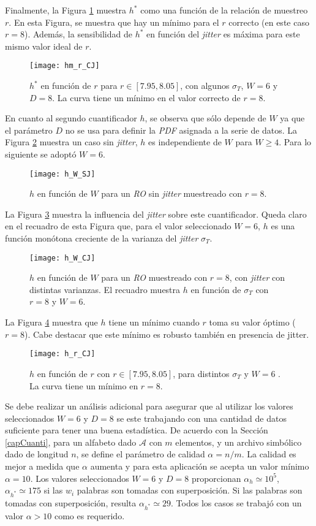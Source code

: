 Finalmente, la Figura \ref{fig:hm_r_CJ} muestra $h^*$ como una función de la relación de muestreo $r$.
En esta Figura, se muestra que hay un mínimo para el $r$ correcto (en este caso $r = 8$).
Además, la sensibilidad de $h^*$ en función del \textit{jitter} es máxima para este mismo valor ideal de $r$.
%
\begin{figure}
\centering
\texttt{[image: hm\_r\_CJ]}
\caption{$h^*$ en función de $r$ para $r\in[7.95,8.05]$, con algunos $\sigma_T$, $W=6$ y $D=8$. La curva tiene un mínimo en el valor correcto de $r=8$.}
\label{fig:hm_r_CJ}
\end{figure}

En cuanto al segundo cuantificador $h$, se observa que sólo depende de $W$ ya que el parámetro $ D $ no se usa para definir la \emph{PDF} asignada a la serie de datos.
La Figura \ref{fig:h_W_SJ} muestra un caso sin \textit{jitter}, $h$ es independiente de $W$ para $W \ge 4$.
Para lo siguiente se adoptó $W = 6$.
%
\begin{figure}
	\centering
	\texttt{[image: h\_W\_SJ]}
	\caption{$h$ en función de $W$ para un \emph{RO} sin \textit{jitter} muestreado con $r=8$.}
	\label{fig:h_W_SJ}
\end{figure}

La Figura \ref{fig:h_W_CJ} muestra la influencia del \textit{jitter} sobre este cuantificador.
Queda claro en el recuadro de esta Figura que, para el valor seleccionado $W = 6$, $h$ es una función monótona creciente de la varianza del \textit{jitter} $\sigma_T$.
%
\begin{figure}
	\centering
	\texttt{[image: h\_W\_CJ]}
	\caption{$h$ en función de $W$ para un \emph{RO} muestreado con $r=8$, con \textit{jitter} con distintas varianzas. El recuadro muestra $h$ en función de $\sigma_T$ con $r=8$ y $W=6$.}
	\label{fig:h_W_CJ}
\end{figure}

La Figura \ref{fig:h_r_CJ} muestra que $h$ tiene un mínimo cuando $r$ toma su valor óptimo ($r = 8$).
Cabe destacar que este mínimo es robusto también en presencia de jitter.
%
\begin{figure}
\centering
\texttt{[image: h\_r\_CJ]}
\caption{$h$ en función de $r$ con $r\in[7.95,8.05]$, para distintos $\sigma_T$ y $W=6$ . La curva tiene un mínimo en $r=8$.}
\label{fig:h_r_CJ}
\end{figure}

Se debe realizar un análisis adicional para asegurar que al utilizar los valores seleccionados $W = 6$ y $D = 8$ se este trabajando con una cantidad de datos suficiente para tener una buena estadística.
De acuerdo con la Sección \ref{capCuanti}, para un alfabeto dado $\mathcal{A}$ con $m$ elementos, y un archivo simbólico dado de longitud $n$, se define el parámetro de calidad $\alpha = n/m$.
La calidad es mejor a medida que $\alpha$ aumenta y para esta aplicación se acepta un valor mínimo $\alpha = 10$.
Los valores seleccionados $W = 6$ y $D = 8$ proporcionan $\alpha_h \simeq 10^5$, $ \alpha_ {h^*} \simeq 175$ si las $w_i$ palabras son tomadas con superposición.
Si las palabras son tomadas con superposición, resulta $ \alpha_ {h^*} \simeq 29$.
Todos los casos se trabajó con un valor $\alpha>10$ como es requerido.

